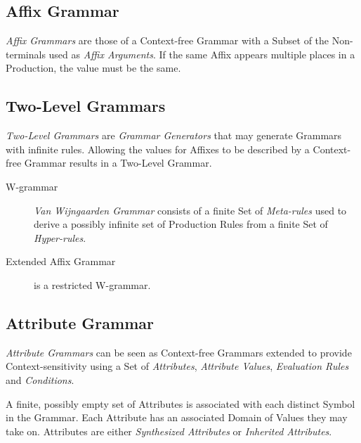 \subsection{Affix Grammar}\label{sec:affix_grammar}

\emph{Affix Grammars} are those of a Context-free Grammar with a
Subset of the Non-terminals used as \emph{Affix Arguments}. If the
same Affix appears multiple places in a Production, the value must be
the same.



\subsection{Two-Level Grammars}\label{sec:two_level_grammar}

\emph{Two-Level Grammars} are \emph{Grammar Generators} that may
generate Grammars with infinite rules. Allowing the values for Affixes
to be described by a Context-free Grammar results in a Two-Level
Grammar.


\begin{description}
\item[W-grammar] \emph{Van Wijngaarden Grammar} consists of a finite
  Set of \emph{Meta-rules} used to derive a possibly infinite set of
  Production Rules from a finite Set of \emph{Hyper-rules}.
\item[Extended Affix Grammar] is a restricted W-grammar.
\end{description}



\subsection{Attribute Grammar}\label{sec:attribute_grammar}
\cite{slonneger-kurtz95}

\emph{Attribute Grammars} can be seen as Context-free Grammars
extended to provide Context-sensitivity using a Set of
\emph{Attributes}, \emph{Attribute Values}, \emph{Evaluation Rules}
and \emph{Conditions}.

A finite, possibly empty set of Attributes is associated with each
distinct Symbol in the Grammar. Each Attribute has an associated
Domain of Values they may take on. Attributes are either
\emph{Synthesized Attributes} or \emph{Inherited Attributes}.

